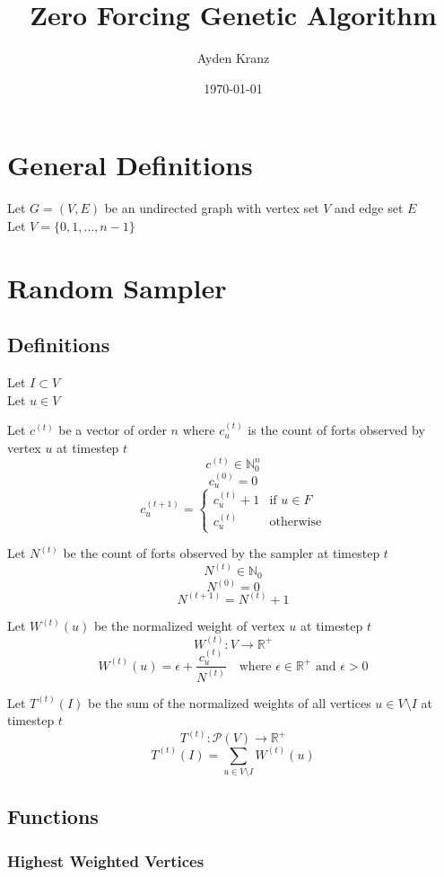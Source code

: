 \documentclass[11pt]{article}
\title{Zero Forcing Genetic Algorithm}
\author{Ayden Kranz}
\date{\today}
\begin{document}
\maketitle

\section{General Definitions}

Let $G=(V,E)$ be an undirected graph with vertex set $V$ and edge set $E$ \\
Let $V=\{0, 1, \dots, n-1\}$

\section{Random Sampler}

\subsection{Definitions}

Let $I \subset V$ \\
Let $u \in V$

Let $c^{(t)}$ be a vector of order $n$ where $c_u^{(t)}$ is the count of forts observed by vertex $u$ at timestep $t$
$$c^{(t)} \in \mathbb{N}_0^n$$
$$c_u^{(0)} = 0$$
$$c_u^{(t+1)} = \begin{cases} c_u^{(t)} + 1 & \text{if } u \in F \\ c_u^{(t)} & \text{otherwise} \end{cases}$$

Let $N^{(t)}$ be the count of forts observed by the sampler at timestep $t$
$$N^{(t)} \in \mathbb{N}_0$$
$$N^{(0)} = 0$$
$$N^{(t+1)} = N^{(t)} + 1$$

Let $W^{(t)}(u)$ be the normalized weight of vertex $u$ at timestep $t$
$$W^{(t)}: V \to \mathbb{R}^+$$
$$W^{(t)}(u) = \epsilon + \frac{c_u^{(t)}}{N^{(t)}} \quad \text{where } \epsilon \in \mathbb{R}^+ \text{ and } \epsilon > 0$$

Let $T^{(t)}(I)$ be the sum of the normalized weights of all vertices $u \in V \setminus I$ at timestep $t$
$$T^{(t)}: \mathcal{P}(V) \to \mathbb{R}^+$$
$$T^{(t)}(I) = \sum_{u \in V \setminus I}{W^{(t)}(u)}$$

\subsection{Functions}

\subsubsection{Highest Weighted Vertices}
\end{document}
